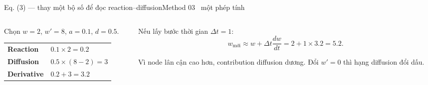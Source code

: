 \documentclass[aspectratio=169,11pt]{beamer}
\begin{document}
\begin{frame}[shrink=24]{Eq. (3) --- thay một bộ số để đọc reaction--diffusion}{Method 03 \textperiodcentered\ một phép tính}
\vspace{3mm}
\begin{columns}[T,onlytextwidth]
\begin{column}{0.50\textwidth}
\begin{intuition}
  Chọn $w=2$, $w'=8$, $a=0.1$, $d=0.5$.\\[2mm]
  \begin{tabular}{ll}
    \textbf{Reaction} & $0.1\times2=0.2$\\
    \textbf{Diffusion} & $0.5\times(8-2)=3$\\
    \textbf{Derivative} & $0.2+3=3.2$
  \end{tabular}
\end{intuition}
\end{column}
\begin{column}{0.46\textwidth}
\begin{mathcard}
  Nếu lấy bước thời gian $\Delta t=1$:
  \[w_{\text{mới}}\approx w+\Delta t\frac{dw}{dt}=2+1\times3.2=5.2.\]
\end{mathcard}
\vspace{3mm}
\begin{takeaway}
  Vì node lân cận cao hơn, contribution diffusion dương. Đổi $w'=0$ thì hạng diffusion đổi dấu.
\end{takeaway}
\end{column}
\end{columns}
\vspace{2mm}
\end{frame}
\end{document}
